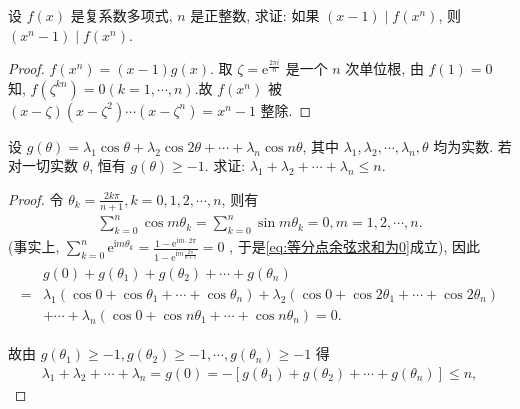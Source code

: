 \begin{exercise}
	设 $f(x)$ 是复系数多项式, $n$ 是正整数, 求证: 如果 $(x-1) \mid f\left(x^n\right)$, 则 $\left(x^n-1\right) \mid f\left(x^n\right)$.
\end{exercise}
\begin{proof}
	$f\left(x^n\right)=(x-1) g(x)$.
	取 $\zeta=\mathrm{e}^{\frac{2 \pi i}{n}}$ 是一个 $n$ 次单位根, 由 $f(1)=0$ 知,  $f\left(\zeta^{k n}\right)=0(k=1, \cdots, n)$.故 $f\left(x^n\right)$ 被 $(x-\zeta)\left(x-\zeta^2\right) \cdots\left(x-\zeta^n\right)=x^n-1$ 整除.
\end{proof}


\begin{exercise}
	设 $g(\theta)=\lambda_1 \cos \theta+\lambda_2 \cos 2 \theta+\cdots+\lambda_n \cos n \theta$, 其中 $\lambda_1, \lambda_2, \cdots, \lambda_n, \theta$ 均为实数. 若对一切实数 $\theta$, 恒有 $g(\theta) \geqslant-1$. 求证: $\lambda_1+\lambda_2+\cdots+\lambda_n \leqslant n$.
\end{exercise}
\begin{proof}
	令 $\theta_k=\frac{2 k \pi}{n+1}, k=0,1,2, \cdots, n$, 则有
	\begin{align}\label{eq:等分点余弦求和为0}
		\sum_{k=0}^n \cos m \theta_k=\sum_{k=0}^n \sin m \theta_k=0, m=1,2, \cdots, n .
	\end{align}
	(事实上,  $\sum_{k=0}^n \mathrm{e}^{\mathrm{i} m \theta_k}=\frac{1-\mathrm{e}^{\mathrm{i} m \cdot 2 \pi}}{1-\mathrm{e}^{\mathrm{i} m \frac{2 \pi}{n+1}}}=0$ , 于是\autoref{eq:等分点余弦求和为0}成立), 因此
	\begin{align*}
		\begin{aligned}
			  & g(0)+g\left(\theta_1\right)+g\left(\theta_2\right)+\cdots+g\left(\theta_n\right)                                                    \\
			= & \lambda_1\left(\cos 0+\cos \theta_1+\cdots+\cos \theta_n\right)+\lambda_2\left(\cos 0+\cos 2 \theta_1+\cdots+\cos 2 \theta_n\right) \\
			  & +\cdots+\lambda_n\left(\cos 0+\cos n \theta_1+\cdots+\cos n \theta_n\right)=0 .
		\end{aligned}
	\end{align*}

	故由 $g\left(\theta_1\right) \geqslant-1, g\left(\theta_2\right) \geqslant-1, \cdots, g\left(\theta_n\right) \geqslant-1$ 得
	\begin{align*}
		\lambda_1+\lambda_2+\cdots+\lambda_n=g(0)=-\left[g\left(\theta_1\right)+g\left(\theta_2\right)+\cdots+g\left(\theta_n\right)\right] \leqslant n,
	\end{align*}
\end{proof}

